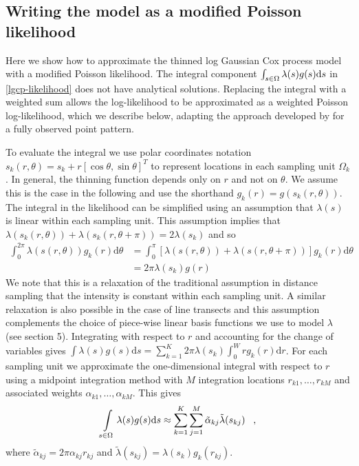 \documentclass[preprint,12pt]{elsarticle}
\newcommand{\tl}{\tilde{\lambda}}   %
\begin{document}
\subsection{Writing the model as a modified Poisson likelihood}

\sloppy Here we show how to approximate the thinned log Gaussian Cox process model with a modified Poisson likelihood.  The integral component $\int\displaylimits_{s \in \Omega} \lambda(s) g(s) \mathrm{d}s$ in \autoref{lgcp-likelihood} does not have analytical solutions.  Replacing the integral with a weighted sum allows the log-likelihood to be approximated as a weighted Poisson log-likelihood, which we describe below, adapting the approach developed by \cite{simpson_going_2016} for a fully observed point pattern.

To evaluate the integral we use polar coordinates notation $s_k(r, \theta) = s_k + r\left[\cos\theta, \sin\theta \right]^T$ to represent locations in each sampling unit $\Omega_k$.   In general, the thinning function depends only on $r$ and not on $\theta$.  We assume this is the case in the following and use the shorthand $g_k(r) = g(s_k(r, \theta))$. The integral in the likelihood can be simplified using an assumption that $\lambda(s)$ is linear within each sampling unit.  This assumption implies that $\lambda(s_k(r, \theta)) + \lambda(s_k(r, \theta + \pi)) = 2\lambda(s_k)$ and so
\begin{align*}
	\int_0^{2\pi} \lambda(s(r, \theta))g_k(r)\mathrm{d}\theta &= \int_0^\pi \left[\lambda(s(r, \theta)) + \lambda(s(r, \theta + \pi)) \right] g_k(r)\mathrm{d}\theta \\
	&= 2\pi \lambda(s_k)g(r)
\end{align*}
We note that this is a relaxation of the traditional assumption in distance sampling that the intensity is constant within each sampling unit.  A similar relaxation is also possible in the case of line transects \citep{yuan_point_2017} and this assumption complements the choice of piece-wise linear basis functions we use to model $\lambda$ (see section 5).  Integrating with respect to $r$ and accounting for the change of variables gives $\int \lambda(s)g(s) \mathrm{d}s = \sum_{k=1}^K 2\pi \lambda(s_k) \int_0^W r g_k(r)\mathrm{d}r$.   For each sampling unit we approximate the one-dimensional integral with respect to $r$ using a midpoint integration method with $M$ integration locations $r_{k1}, \ldots, r_{kM}$ and associated weights $\alpha_{k1}, \ldots, \alpha_{kM}$.  This gives
\begin{equation*}
	\int\displaylimits_{s \in \Omega} \lambda(s)g(s)\mathrm{d}s \approx \sum_{k=1}^K \sum_{j=1}^M \tilde{\alpha}_{kj} \tl(s_{kj}) \;\;\; ,
\end{equation*}
where $\tilde{\alpha}_{kj} = 2\pi \alpha_{kj}r_{kj}$ and $\tl(s_{kj}) = \lambda(s_k) g_k(r_{kj})$.
\end{document}
